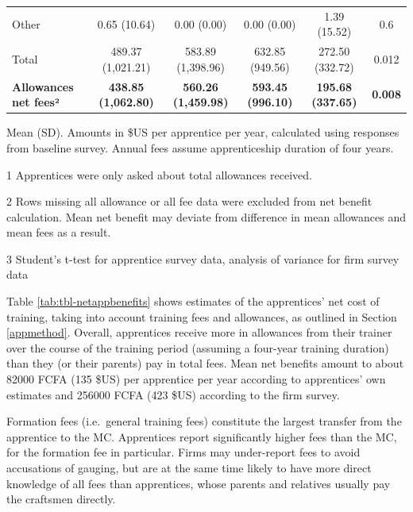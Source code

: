 \documentclass[
  11pt,
a4paper
]{report}
\begin{document}
\begin{table}[H]
{\begin{threeparttable}
\begin{tabular}[t]{lccccc}
\hspace{1em}\hspace{1em}Other & 0.65 (10.64) & 0.00 (0.00) & 0.00 (0.00) & 1.39 (15.52) & 0.6\\
\hspace{1em}\hspace{1em}Total & 489.37 (1,021.21) & 583.89 (1,398.96) & 632.85 (949.56) & 272.50 (332.72) & 0.012\\
\textbf{\hspace{1em}Allowances net fees²} & \textbf{438.85 (1,062.80)} & \textbf{560.26 (1,459.98)} & \textbf{593.45 (996.10)} & \textbf{195.68 (337.65)} & \textbf{0.008}\\
\bottomrule
\end{tabular}
\begin{tablenotes}
\small
\item Mean (SD). Amounts in \$US per apprentice per year, calculated using responses from baseline survey. Annual fees assume apprenticeship duration of four years.
\item[1] Apprentices were only asked about total allowances received.
\item[2] Rows missing all allowance or all fee data were excluded from net benefit calculation. Mean net benefit may deviate from difference in mean allowances and mean fees as a result.
\item[3] Student's t-test for apprentice survey data, analysis of variance for firm survey data
\end{tablenotes}
\end{threeparttable}}
\end{table}

\noindent Table \ref{tab:tbl-netappbenefits} shows estimates of the apprentices' net cost of training, taking into account training fees and allowances, as outlined in Section \ref{appmethod}. Overall, apprentices receive more in allowances from their trainer over the course of the training period (assuming a four-year training duration) than they (or their parents) pay in total fees. Mean net benefits amount to about 82000 FCFA (135 \$US) per apprentice per year according to apprentices' own estimates and 256000 FCFA (423 \$US) according to the firm survey.

Formation fees (i.e.~general training fees) constitute the largest transfer from the apprentice to the MC. Apprentices report significantly higher fees than the MC, for the formation fee in particular. Firms may under-report fees to avoid accusations of gauging, but are at the same time likely to have more direct knowledge of all fees than apprentices, whose parents and relatives usually pay the craftsmen directly.
\end{document}

